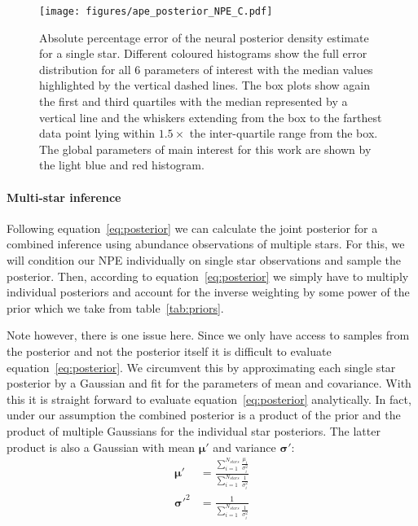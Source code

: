 \documentclass{aa}
\begin{document}
\begin{figure}[]
     \centering
     \texttt{[image: figures/ape\_posterior\_NPE\_C.pdf]}
     \vspace{-.5cm}
     \caption{Absolute percentage error of the neural posterior density estimate for a single star. Different coloured histograms show the full error distribution for all 6 parameters of interest with the median values highlighted by the vertical dashed lines. The box plots show again the first and third quartiles with the median represented by a vertical line and the whiskers extending from the box to the farthest data point lying within $1.5\times$ the inter-quartile range from the box. The global parameters of main interest for this work are shown by the light blue and red histogram.}
     \label{fig:posterior_APE}
\end{figure}

\paragraph{Multi-star inference}
Following equation~\ref{eq:posterior} we can calculate the joint posterior for a combined inference using abundance observations of multiple stars. For this, we will condition our NPE individually on single star observations and sample the posterior. Then, according to equation~\ref{eq:posterior} we simply have to multiply individual posteriors and account for the inverse weighting by some power of the prior which we take from table~\ref{tab:priors}. 

Note however, there is one issue here. Since we only have access to samples from the posterior and not the posterior itself it is difficult to evaluate equation~\ref{eq:posterior}. We circumvent this by approximating each single star posterior by a Gaussian and fit for the parameters of mean and covariance. With this it is straight forward to evaluate equation~\ref{eq:posterior} analytically. In fact, under our assumption the combined posterior is a product of the prior and the product of multiple Gaussians for the individual star posteriors. The latter product is also a Gaussian with mean $\mathbf{\mu'}$ and variance $\mathbf{\sigma'}$:
\begin{align}
    \mathbf{\mu'} &= \frac{\sum_{i=1}^{N_{stars}} \frac{\mu_i}{\sigma_i^2}}{\sum_{i=1}^{N_{stars}} \frac1{\sigma_i^2}} \\
\mathbf{\sigma'}^2 &= \frac1 {\sum_{i=1}^{N_{stars}} \frac1{\sigma_i^2}}
\end{align}
\end{document}
